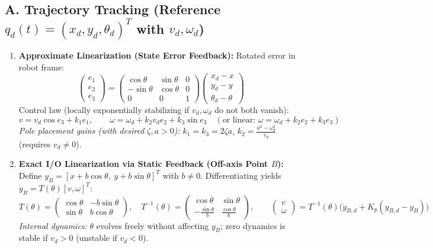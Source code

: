 \documentclass[10pt, a4paper]{article}
\begin{document}
\subsection*{A. Trajectory Tracking (Reference $q_d(t) = (x_d, y_d, \theta_d)^T$ with $v_d, \omega_d$)}
\begin{enumerate}
    \item \textbf{Approximate Linearization (State Error Feedback):}
    Rotated error in robot frame:
    \[
        \begin{pmatrix} e_1 \\ e_2 \\ e_3 \end{pmatrix} = \begin{pmatrix} \cos\theta & \sin\theta & 0 \\ -\sin\theta & \cos\theta & 0 \\ 0 & 0 & 1 \end{pmatrix} \begin{pmatrix} x_d - x \\ y_d - y \\ \theta_d - \theta \end{pmatrix}
    \]
    Control law (locally exponentially stabilizing if $v_d, \omega_d$ do not both vanish):
    \[
        v = v_d\cos e_3 + k_1 e_1, \qquad \omega = \omega_d + k_2 v_d e_2 + k_3 \sin e_3 \quad (\text{or linear: } \omega = \omega_d + k_2 e_2 + k_3 e_3)
    \]
    \textit{Pole placement gains (with desired $\zeta, a > 0$):} $k_1 = k_3 = 2\zeta a$, $k_2 = \frac{a^2 - \omega_d^2}{v_d}$ (requires $v_d \neq 0$).
    \item \textbf{Exact I/O Linearization via Static Feedback (Off-axis Point $B$):}
    Define $y_B = [x + b\cos\theta, \; y + b\sin\theta]^T$ with $b \neq 0$. Differentiating yields $\dot{y}_B = T(\theta)[v, \omega]^T$:
    \[
        T(\theta) = \begin{pmatrix} \cos\theta & -b\sin\theta \\ \sin\theta & b\cos\theta \end{pmatrix}, \quad T^{-1}(\theta) = \begin{pmatrix} \cos\theta & \sin\theta \\ -\frac{\sin\theta}{b} & \frac{\cos\theta}{b} \end{pmatrix}, \qquad \begin{pmatrix} v \\ \omega \end{pmatrix} = T^{-1}(\theta)\Big(\dot{y}_{B,d} + K_p(y_{B,d} - y_B)\Big)
    \]
    \textit{Internal dynamics:} $\theta$ evolves freely without affecting $y_B$; zero dynamics is stable if $v_d > 0$ (unstable if $v_d < 0$).

\end{enumerate}
\end{document}
